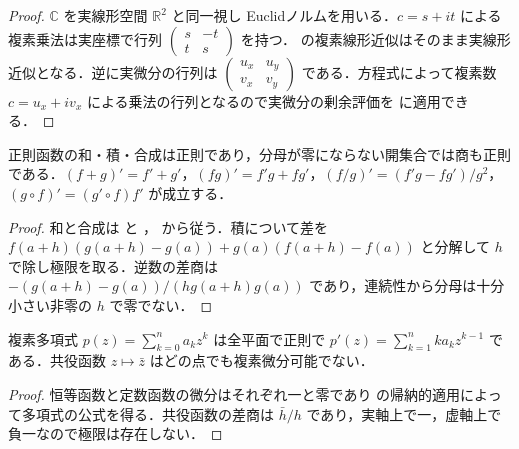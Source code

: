 \begin{proof}
$\mathbb C$ を実線形空間 $\mathbb R^2$ と同一視し Euclidノルムを用いる．$c=s+it$ による複素乗法は実座標で行列 $\begin{pmatrix}s&-t\\t&s\end{pmatrix}$ を持つ． の複素線形近似はそのまま実線形近似となる．逆に実微分の行列は $\begin{pmatrix}u_x&u_y\\v_x&v_y\end{pmatrix}$ である．方程式によって複素数 $c=u_x+iv_x$ による乗法の行列となるので実微分の剰余評価を  に適用できる．
\end{proof}
\begin{prop}[正則函数の演算法則]
正則函数の和・積・合成は正則であり，分母が零にならない開集合では商も正則である．$(f+g)'=f'+g'$，$(fg)'=f'g+fg'$，$(f/g)'=(f'g-fg')/g^2$，$(g\circ f)'=(g'\circ f)f'$ が成立する．
\end{prop}
\begin{proof}
和と合成は  と ， から従う．積について差を $f(a+h)(g(a+h)-g(a))+g(a)(f(a+h)-f(a))$ と分解して $h$ で除し極限を取る．逆数の差商は $-(g(a+h)-g(a))/(hg(a+h)g(a))$ であり，連続性から分母は十分小さい非零の $h$ で零でない．
\end{proof}
\begin{example}[多項式と共役函数]
複素多項式 $p(z)=\sum_{k=0}^n a_kz^k$ は全平面で正則で $p'(z)=\sum_{k=1}^nka_kz^{k-1}$ である．共役函数 $z\mapsto\bar z$ はどの点でも複素微分可能でない．
\end{example}
\begin{proof}
恒等函数と定数函数の微分はそれぞれ一と零であり  の帰納的適用によって多項式の公式を得る．共役函数の差商は $\bar h/h$ であり，実軸上で一，虚軸上で負一なので極限は存在しない．
\end{proof}
